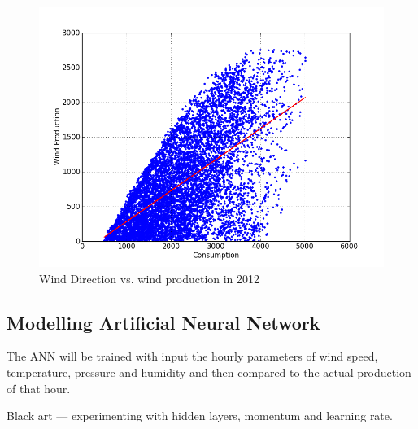 \begin{figure}[h!]
\centering
\includegraphics[width=0.99\linewidth,natwidth=898,natheight=587]{billeder/consumptionVsWindProduction.png}
\caption{Wind Direction vs. wind production in 2012}
\label{fig:consumptionVsWindProduction}
\end{figure}

\subsection{Modelling Artificial Neural Network}
The ANN will be trained with input the hourly parameters of wind speed, temperature, pressure and humidity and then compared to the actual production of that hour.

Black art --- experimenting with hidden layers, momentum and learning rate. 